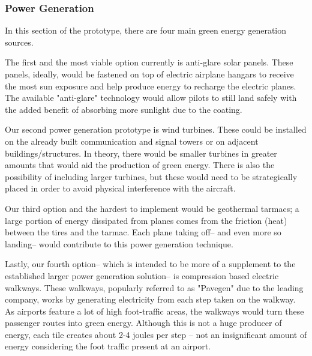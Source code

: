 \documentclass[../main.tex]{subfiles}
\begin{document}
\subsubsection{Power Generation}
In this section of the prototype, there are four main green energy generation sources.\par
The first and the most viable option currently is anti-glare solar panels. These panels, ideally, would be fastened on top of electric airplane hangars to receive the most sun exposure and help produce energy to recharge the electric planes. The available "anti-glare" technology would allow pilots to still land safely with the added benefit of absorbing more sunlight due to the coating.\par
Our second power generation prototype is wind turbines. These could be installed on the already built communication and signal towers or on adjacent buildings/structures. In theory, there would be smaller turbines in greater amounts that would aid the production of green energy. There is also the possibility of including larger turbines, but these would need to be strategically placed in order to avoid physical interference with the aircraft.\par
Our third option and the hardest to implement would be geothermal tarmacs; a large portion of energy dissipated from planes comes from the friction (heat) between the tires and the tarmac. Each plane taking off-- and even more so landing-- would contribute to this power generation technique. \par
Lastly, our fourth option-- which is intended to be more of a supplement to the established larger power generation solution-- is compression based electric walkways. These walkways, popularly referred to as "Pavegen" due to the leading company, works by generating electricity from each step taken on the walkway. As airports feature a lot of high foot-traffic areas, the walkways would turn these passenger routes into green energy. Although this is not a huge producer of energy, each tile creates about 2-4 joules per step -- not an insignificant amount of energy considering the foot traffic present at an airport.
\newpage
\end{document}
